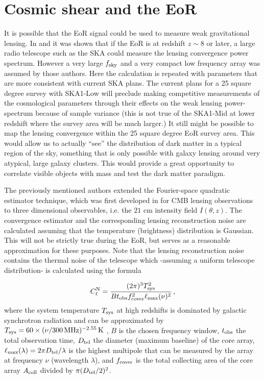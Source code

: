 \documentclass{PoS}
\begin{document}
\section{Cosmic shear and the EoR}
It is possible that the EoR signal could be used to measure weak gravitational lensing.
In \cite{Zahn:2005ap} and \cite{Metcalf:2009}  it was shown that if the EoR is at redshift 
$z \sim 8$ or later, a large radio telescope such as the SKA could measure the lensing convergence power spectrum.  However a very large $f_{\rm sky}$ and a very compact low frequency array was assumed by those authors.  Here the calculation is repeated with parameters that are more consistent with current SKA plans.  The current plans for a 25 square degree survey with SKA1-Low will preclude making competitive measurements of the cosmological parameters through their effects on the weak lensing power-spectrum because of sample variance (this is not true of the SKA1-Mid at lower redshift where the survey area will be much larger.)  It still might be possible to map the lensing convergence within the 25 square degree EoR survey area.  This would allow us to actually ``see'' the distribution of dark matter in a typical region of the sky, something that is only possible with galaxy lensing around very atypical, large galaxy clusters.  This would provide a great opportunity to correlate visible objects with mass and test the dark matter paradigm.

The previously mentioned authors extended the
Fourier-space quadratic estimator technique, which was first developed in 
\cite{Hu:2001tn} for CMB lensing  observations to three dimensional
observables, i.e. the $21$ cm intensity field $I(\theta,z)$.  
The  convergence
estimator and the corresponding lensing reconstruction noise are
calculated assuming that the temperature (brightness) distribution is
Gaussian. This will not be strictly true during the EoR, but serves as a reasonable approximation for these purposes. Note that the lensing reconstruction noise contains the thermal noise of the telescope which -assuming a uniform telescope distribution- is calculated using the formula

\begin{equation}
C^{\rm N}_\ell = \frac{(2\pi)^3 T^2_{\rm sys}}{B t_{\rm obs} f^2_{\rm cover} \ell_{\rm max}(\nu)^2} \, ,
\end{equation} where the system temperature $T_{\rm sys}$ at high redshifts
 is dominated by galactic synchrotron radiation and can be approximated by $T_{\rm sys} = 60 \times (\nu/300 \, {\rm MHz})^{-2.55} \, {\rm K}$ \cite{Dewdney:2013}, $B$ is the chosen frequency window, $t_{\rm obs}$ the total observation time, $D_{\rm tel}$ the diameter (maximum baseline) of the core array, $\ell_{\rm max}(\lambda)=2\pi D_{\rm tel}/\lambda$ is the highest multipole that can be measured by the array at frequency $\nu$ (wavelength $\lambda$), and $f_{\rm cover}$ is the total collecting area of the core array $A_{\rm coll}$ divided by $\pi(D_{\rm tel}/2)^2$. 
 
\end{document}
